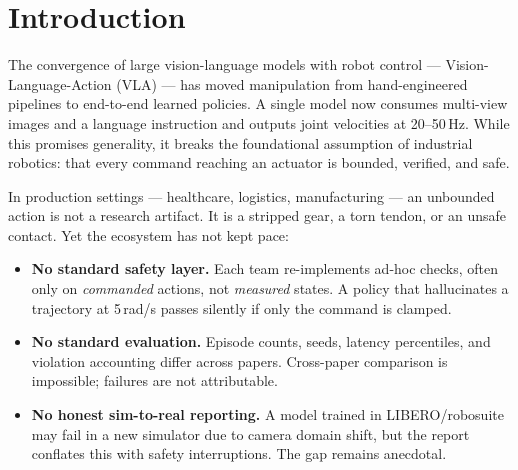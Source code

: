 \documentclass[11pt,a4paper,twocolumn]{article}
\begin{document}
\section{Introduction}

The convergence of large vision-language models with robot control --- Vision-Language-Action (VLA) --- has moved manipulation from hand-engineered pipelines to end-to-end learned policies. A single model now consumes multi-view images and a language instruction and outputs joint velocities at 20--50\,Hz. While this promises generality, it breaks the foundational assumption of industrial robotics: that every command reaching an actuator is bounded, verified, and safe.

In production settings --- healthcare, logistics, manufacturing --- an unbounded action is not a research artifact. It is a stripped gear, a torn tendon, or an unsafe contact. Yet the ecosystem has not kept pace:

\begin{itemize}
\item \textbf{No standard safety layer.} Each team re-implements ad-hoc checks, often only on \textit{commanded} actions, not \textit{measured} states. A policy that hallucinates a trajectory at 5\,rad/s passes silently if only the command is clamped.
\item \textbf{No standard evaluation.} Episode counts, seeds, latency percentiles, and violation accounting differ across papers. Cross-paper comparison is impossible; failures are not attributable.
\item \textbf{No honest sim-to-real reporting.} A model trained in LIBERO/robosuite may fail in a new simulator due to camera domain shift, but the report conflates this with safety interruptions. The gap remains anecdotal.
\end{itemize}
\end{document}
